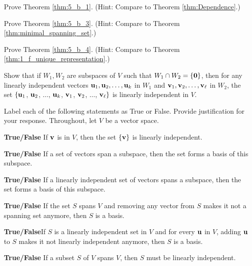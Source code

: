 \item Prove Theorem \ref{thm:5_b_1}. (Hint: Compare to Theorem \ref{thm:Dependence}.) 


\item Prove Theorem \ref{thm:5_b_3}.  (Hint: Compare to Theorem \ref{thm:minimal_spanning_set}.)


\item Prove Theorem \ref{thm:5_b_4}. (Hint: Compare to Theorem \ref{thm:1_f_unique_representation}.)

\item \label{problem:disjoint_subspaces} Show that if $W_1, W_2$ are subspaces of $V$ such that $W_1\cap W_2 = \{ \mathbf{0} \}$, then for any linearly independent vectors $\mathbf{u}_1, \mathbf{u}_2, \ldots, \mathbf{u}_k$ in $W_1$ and $\mathbf{v}_1, \mathbf{v}_2, \ldots, \mathbf{v}_\ell$ in $W_2$, the set $\{ \mathbf{u}_1$, $\mathbf{u}_2$, $\ldots$, $\mathbf{u}_k$, $\mathbf{v}_1$, $\mathbf{v}_2$, $\ldots$, $\mathbf{v}_\ell\}$ is linearly independent in $V$.

\item Label each of the following statements as True or False. Provide justification for your response. Throughout, let $V$ be a vector space. 
\ba
\item \textbf{True/False} If $\mathbf{v}$ is in $V$, then the set $\{\mathbf{v}\}$ is linearly independent. 


\item \textbf{True/False} If a set of vectors span a subspace, then the set forms a basis of this subspace.

\item \textbf{True/False} If a linearly independent set of vectors spans a subspace, then the set forms a basis of this subspace. 

\item \textbf{True/False} If the set $S$ spans $V$ and removing any vector from $S$ makes it not a spanning set anymore, then $S$ is a basis.


\item \textbf{True/False}If $S$ is a linearly independent set in $V$ and for every $\mathbf{u}$ in $V$, adding $\mathbf{u}$ to $S$ makes it not linearly independent anymore, then $S$ is a basis.

\item \textbf{True/False} If a subset $S$ of $V$ spans $V$, then $S$ must be linearly independent. 

